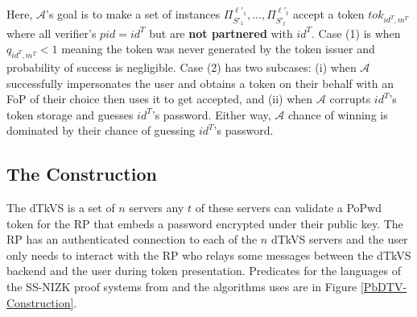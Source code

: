 \documentclass[conference]{IEEEtran}
\newcommand{\cA}{\mathcal{A}}
\newcommand{\uid}{id}
\newcommand{\pid}{$pid$}
\def\mg{\color{magenta}}
\begin{document}
Here, $\cA$'s goal is to make a set of instances $\Pi^{\ell'_1}_{S'_1},...,\Pi^{\ell'_t}_{S'_t}$ accept a token $tok_{\uid^{T},m^{T}}$ where all verifier's \pid$=\uid^{T}$ but are \textbf{not partnered} with $\uid^{T}$. Case (1) is when $q_{\uid^{T},m^{T}} < 1$ meaning the token was never generated by the token issuer and probability of success is negligible. 
Case (2) has two subcases: (i) when $\cA$ successfully impersonates the user and obtains a token on their behalf with an FoP of their choice then uses it to get accepted, and (ii) when $\cA$ corrupts $\uid^{T}$'s token storage and guesses $\uid^{T}$'s password. Either way, $\cA$ chance of winning is dominated by their chance of guessing $\uid^{T}$'s password.

\subsection{The Construction}
\label{sec:Construction_of_PbDTV}
The dTkVS is a set of $n$ servers %
any $t$ of these servers can validate a PoPwd token for the RP that embeds a password encrypted under their public key. The RP has an authenticated connection to each of the $n$ dTkVS servers and the user only needs to interact with the RP who relays some messages between the dTkVS backend and the user during token presentation. Predicates for the languages of the SS-NIZK proof systems from \cite{T-PAKE-Mackenzie} and the algorithms uses are in Figure \ref{PbDTV-Construction}.
\end{document}

